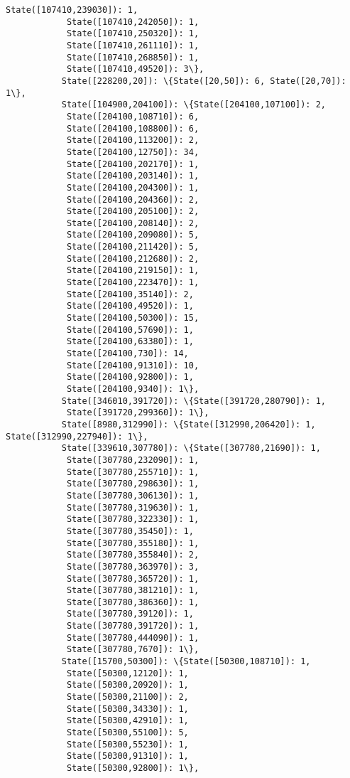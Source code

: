 \documentclass[11pt]{article}
\begin{document}
\begin{Verbatim}[commandchars=\\\{\}]
            State([107410,239030]): 1,
            State([107410,242050]): 1,
            State([107410,250320]): 1,
            State([107410,261110]): 1,
            State([107410,268850]): 1,
            State([107410,49520]): 3\},
           State([228200,20]): \{State([20,50]): 6, State([20,70]): 1\},
           State([104900,204100]): \{State([204100,107100]): 2,
            State([204100,108710]): 6,
            State([204100,108800]): 6,
            State([204100,113200]): 2,
            State([204100,12750]): 34,
            State([204100,202170]): 1,
            State([204100,203140]): 1,
            State([204100,204300]): 1,
            State([204100,204360]): 2,
            State([204100,205100]): 2,
            State([204100,208140]): 2,
            State([204100,209080]): 5,
            State([204100,211420]): 5,
            State([204100,212680]): 2,
            State([204100,219150]): 1,
            State([204100,223470]): 1,
            State([204100,35140]): 2,
            State([204100,49520]): 1,
            State([204100,50300]): 15,
            State([204100,57690]): 1,
            State([204100,63380]): 1,
            State([204100,730]): 14,
            State([204100,91310]): 10,
            State([204100,92800]): 1,
            State([204100,9340]): 1\},
           State([346010,391720]): \{State([391720,280790]): 1,
            State([391720,299360]): 1\},
           State([8980,312990]): \{State([312990,206420]): 1, State([312990,227940]): 1\},
           State([339610,307780]): \{State([307780,21690]): 1,
            State([307780,232090]): 1,
            State([307780,255710]): 1,
            State([307780,298630]): 1,
            State([307780,306130]): 1,
            State([307780,319630]): 1,
            State([307780,322330]): 1,
            State([307780,35450]): 1,
            State([307780,355180]): 1,
            State([307780,355840]): 2,
            State([307780,363970]): 3,
            State([307780,365720]): 1,
            State([307780,381210]): 1,
            State([307780,386360]): 1,
            State([307780,39120]): 1,
            State([307780,391720]): 1,
            State([307780,444090]): 1,
            State([307780,7670]): 1\},
           State([15700,50300]): \{State([50300,108710]): 1,
            State([50300,12120]): 1,
            State([50300,20920]): 1,
            State([50300,21100]): 2,
            State([50300,34330]): 1,
            State([50300,42910]): 1,
            State([50300,55100]): 5,
            State([50300,55230]): 1,
            State([50300,91310]): 1,
            State([50300,92800]): 1\},

\end{Verbatim}
\end{document}
